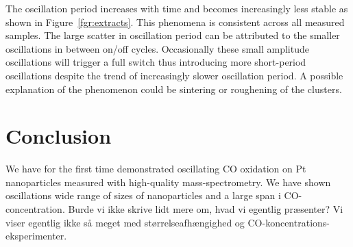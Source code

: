\documentclass[8.5pt,twoside,twocolumn]{article}
\begin{document}
The oscillation period increases with time and becomes increasingly less stable as shown in Figure~\ref{fgr:extracts}. This phenomena is consistent across all measured samples. The large scatter in oscillation period can be attributed to the smaller oscillations in between on/off cycles. Occasionally these small amplitude oscillations will trigger a full switch thus introducing more short-period oscillations despite the trend of increasingly slower oscillation period. A possible explanation of the phenomenon could be sintering or roughening of the clusters.


\section{Conclusion}
We have for the first time demonstrated oscillating CO oxidation on Pt nanoparticles measured with high-quality mass-spectrometry. We have shown oscillations wide range of sizes of nanoparticles and a large span i CO-concentration. Burde vi ikke skrive lidt mere om, hvad vi egentlig præsenter? Vi viser egentlig ikke så meget med størrelseafhængighed og CO-koncentrations-eksperimenter.




\end{document}

